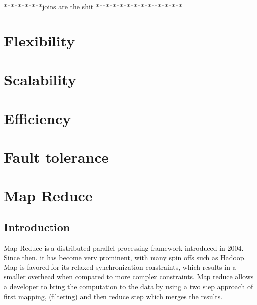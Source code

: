 \documentclass[10pt,twocolumn]{IEEEtran11}
\begin{document}
***********joins are the shit *************************


\section{Flexibility}
 
\section{Scalability}

\section{Efficiency}

\section{Fault tolerance}




























\section{Map Reduce}
\subsection{Introduction}
Map Reduce is a distributed parallel processing framework introduced in 2004\cite{dean2001mapreduce}.  Since then, it has become very prominent, with many spin offs such as Hadoop.  Map is favored for its relaxed synchronization constraints, which results in a smaller overhead when compared to more complex constraints.  Map reduce allows a developer to bring the computation to the data by using a two step approach of first mapping, (filtering) and then reduce step which merges the results.
\end{document}
